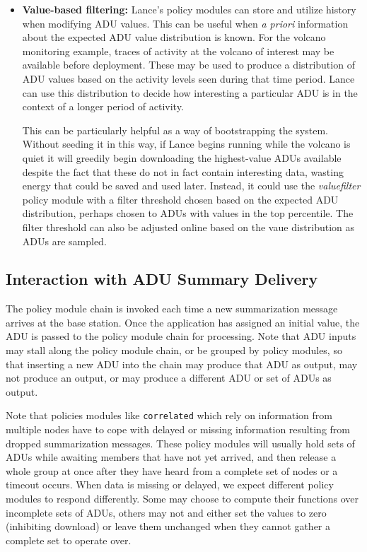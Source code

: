 \begin{itemize}
\item \textbf{Value-based filtering:} Lance's policy modules can store and
utilize history when modifying ADU values. This can be useful when \textit{a
priori} information about the expected ADU value distribution is known. For
the volcano monitoring example, traces of activity at the volcano of interest
may be available before deployment. These may be used to produce a
distribution of ADU values based on the activity levels seen during that time
period. Lance can use this distribution to decide how interesting a
particular ADU is in the context of a longer period of activity.

\hspace{0.25in} This can be particularly helpful as a way of bootstrapping
the system. Without seeding it in this way, if Lance begins running while the
volcano is quiet it will greedily begin downloading the highest-value ADUs
available despite the fact that these do not in fact contain interesting
data, wasting energy that could be saved and used later. Instead, it could
use the \textit{valuefilter} policy module with a filter threshold chosen
based on the expected ADU distribution, perhaps chosen to ADUs with values in
the top percentile. The filter threshold can also be adjusted online based on
the vaue distribution as ADUs are sampled.

\end{itemize}

\subsection{Interaction with ADU Summary Delivery}

The policy module chain is invoked each time a new summarization message
arrives at the base station. Once the application has assigned an initial
value, the ADU is passed to the policy module chain for processing. Note that
ADU inputs may stall along the policy module chain, or be grouped by policy
modules, so that inserting a new ADU into the chain may produce that ADU as
output, may not produce an output, or may produce a different ADU or set of
ADUs as output.

Note that policies modules like \texttt{correlated} which rely on information
from multiple nodes have to cope with delayed or missing information
resulting from dropped summarization messages. These policy modules will
usually hold sets of ADUs while awaiting members that have not yet arrived,
and then release a whole group at once after they have heard from a complete
set of nodes or a timeout occurs. When data is missing or delayed, we expect
different policy modules to respond differently. Some may choose to compute
their functions over incomplete sets of ADUs, others may not and either set
the values to zero (inhibiting download) or leave them unchanged when they
cannot gather a complete set to operate over.

